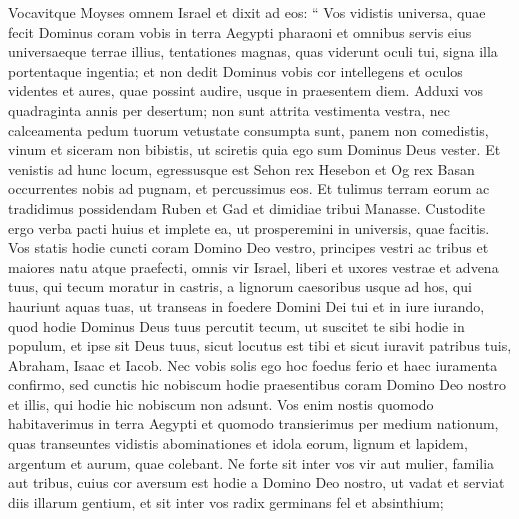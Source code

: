 \begin{biblechapter}
\begin{biblechapter}
\begin{biblechapter}
\begin{biblechapter}
\begin{biblechapter}
\begin{biblechapter}
\begin{biblechapter}
\begin{biblechapter}
\begin{biblechapter}
\begin{biblechapter}
\begin{biblechapter}
\begin{biblechapter}
\begin{biblechapter}
\begin{biblechapter}
\begin{biblechapter}
\begin{biblechapter}
\begin{biblechapter}
\begin{biblechapter}
\begin{biblechapter}
\begin{biblechapter}
\begin{biblechapter}
\begin{biblechapter}
\begin{biblechapter}
\begin{biblechapter}
\begin{biblechapter}
\begin{biblechapter}
\begin{biblechapter}
\begin{biblechapter}
\begin{biblechapter}
\verse Vocavitque Moyses omnem Israel et dixit ad eos: “ Vos vidistis universa, quae fecit Dominus coram vobis in terra Aegypti pharaoni et omnibus servis eius universaeque terrae illius, 
\verse tentationes magnas, quas viderunt oculi tui, signa illa portentaque ingentia; 
\verse et non dedit Dominus vobis cor intellegens et oculos videntes et aures, quae possint audire, usque in praesentem diem. 
\verse Adduxi vos quadraginta annis per desertum; non sunt attrita vestimenta vestra, nec calceamenta pedum tuorum vetustate consumpta sunt, 
\verse panem non comedistis, vinum et siceram non bibistis, ut sciretis quia ego sum Dominus Deus vester. 
 \verse Et venistis ad hunc locum, egressusque est Sehon rex Hesebon et Og rex Basan occurrentes nobis ad pugnam, et percussimus eos. 
\verse Et tulimus terram eorum ac tradidimus possidendam Ruben et Gad et dimidiae tribui Manasse. 
\verse Custodite ergo verba pacti huius et implete ea, ut prosperemini in universis, quae facitis.
 \verse Vos statis hodie cuncti coram Domino Deo vestro, principes vestri ac tribus et maiores natu atque praefecti, omnis vir Israel, 
\verse liberi et uxores vestrae et advena tuus, qui tecum moratur in castris, a lignorum caesoribus usque ad hos, qui hauriunt aquas tuas, 
\verse ut transeas in foedere Domini Dei tui et in iure iurando, quod hodie Dominus Deus tuus percutit tecum, 
\verse ut suscitet te sibi hodie in populum, et ipse sit Deus tuus, sicut locutus est tibi et sicut iuravit patribus tuis, Abraham, Isaac et Iacob.
 \verse Nec vobis solis ego hoc foedus ferio et haec iuramenta confirmo, 
\verse sed cunctis hic nobiscum hodie praesentibus coram Domino Deo nostro et illis, qui hodie hic nobiscum non adsunt. 
\verse Vos enim nostis quomodo habitaverimus in terra Aegypti et quomodo transierimus per medium nationum, quas transeuntes 
 \verse vidistis abominationes et idola eorum, lignum et lapidem, argentum et aurum, quae colebant. 
\verse Ne forte sit inter vos vir aut mulier, familia aut tribus, cuius cor aversum est hodie a Domino Deo nostro, ut vadat et serviat diis illarum gentium, et sit inter vos radix germinans fel et absinthium; 

\end{biblechapter}
\end{biblechapter}
\end{biblechapter}
\end{biblechapter}
\end{biblechapter}
\end{biblechapter}
\end{biblechapter}
\end{biblechapter}
\end{biblechapter}
\end{biblechapter}
\end{biblechapter}
\end{biblechapter}
\end{biblechapter}
\end{biblechapter}
\end{biblechapter}
\end{biblechapter}
\end{biblechapter}
\end{biblechapter}
\end{biblechapter}
\end{biblechapter}
\end{biblechapter}
\end{biblechapter}
\end{biblechapter}
\end{biblechapter}
\end{biblechapter}
\end{biblechapter}
\end{biblechapter}
\end{biblechapter}
\end{biblechapter}

